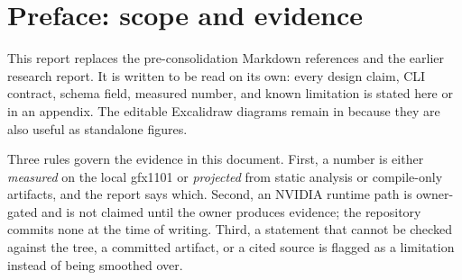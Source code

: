 \documentclass[11pt,twoside,a4paper]{article}
\newcommand{\fpath}[1]{\texttt{\detokenize{#1}}}
\newcommand{\term}[1]{\emph{#1}}
\begin{document}
\begin{abstract}
\noindent
kernscope is a C++20 toolchain for GPU kernels. Six tools profile a running
binary, capture a hot launch, analyze the captured instruction set, generate
or rewrite kernel variants, verify them before compilation, and benchmark the
result. They share one library stack, one report schema, and one provenance
discipline. The tools form a closed loop: the analyzer reads the captured
kernel's ISA, the verifier gates the tuner's variants, and the profiler's
hints cite the analyzer findings that explain them.

This report is the archival account of the project. It consolidates the
architecture notes, the six per-tool references, the capture format and field
mapping, the verifier soundness scope, the schema definitions, the
reproducibility guide, the research briefs, and the committed evidence into
one document. It describes the design and the implementation, then states what
was measured on the local AMD Radeon RX 7800 XT (gfx1101), what remains
projected from compile-only artifacts, and what was not tested. The measured
results include a 153\,s end-to-end demo against a 900\,s budget, a bitwise
capture replay, a 4-wide vectorization delta on layernorm, and machine peaks
of 16.32\,TFLOPS fp32, 591\,GB/s DRAM read, and 9.7\,TB/s LDS. No NVIDIA
runtime numbers appear anywhere in the repository or in this report.
\end{abstract}

\section*{Preface: scope and evidence}

This report replaces the pre-consolidation Markdown references and the
earlier research report. It is written to be read on its own: every design
claim, CLI contract, schema field, measured number, and known limitation is
stated here or in an appendix. The editable Excalidraw diagrams remain in
\fpath{docs/diagrams/} because they are also useful as standalone figures.

Three rules govern the evidence in this document. First, a number is either
\term{measured} on the local gfx1101 or \term{projected} from static analysis
or compile-only artifacts, and the report says which. Second, an NVIDIA
runtime path is owner-gated and is not claimed until the owner produces
evidence; the repository commits none at the time of writing. Third, a
statement that cannot be checked against the tree, a committed artifact, or a
cited source is flagged as a limitation instead of being smoothed over.
\end{document}
